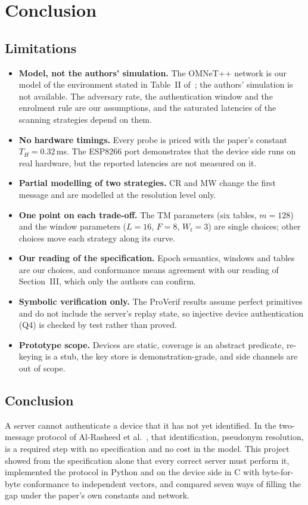 \chapter{Conclusion}

\section{Limitations}
\begin{itemize}
\item \textbf{Model, not the authors' simulation.} The OMNeT++ network is our model of the environment stated in Table~II of~\cite{base}; the authors' simulation is not available. The adversary rate, the authentication window and the enrolment rule are our assumptions, and the saturated latencies of the scanning strategies depend on them.
\item \textbf{No hardware timings.} Every probe is priced with the paper's constant $T_H=0.32$\,ms. The ESP8266 port demonstrates that the device side runs on real hardware, but the reported latencies are not measured on it.
\item \textbf{Partial modelling of two strategies.} CR and MW change the first message and are modelled at the resolution level only.
\item \textbf{One point on each trade-off.} The TM parameters (six tables, $m=128$) and the window parameters ($L=16$, $F=8$, $W_t=3$) are single choices; other choices move each strategy along its curve.
\item \textbf{Our reading of the specification.} Epoch semantics, windows and tables are our choices, and conformance means agreement with our reading of Section~III, which only the authors can confirm.
\item \textbf{Symbolic verification only.} The ProVerif results assume perfect primitives and do not include the server's replay state, so injective device authentication (Q4) is checked by test rather than proved.
\item \textbf{Prototype scope.} Devices are static, coverage is an abstract predicate, re-keying is a stub, the key store is demonstration-grade, and side channels are out of scope.
\end{itemize}

\section{Conclusion}
A server cannot authenticate a device that it has not yet identified. In the two-message protocol of Al-Rasheed et al.~\cite{base}, that identification, pseudonym resolution, is a required step with no specification and no cost in the model. This project showed from the specification alone that every correct server must perform it, implemented the protocol in Python and on the device side in C with byte-for-byte conformance to independent vectors, and compared seven ways of filling the gap under the paper's own constants and network.

